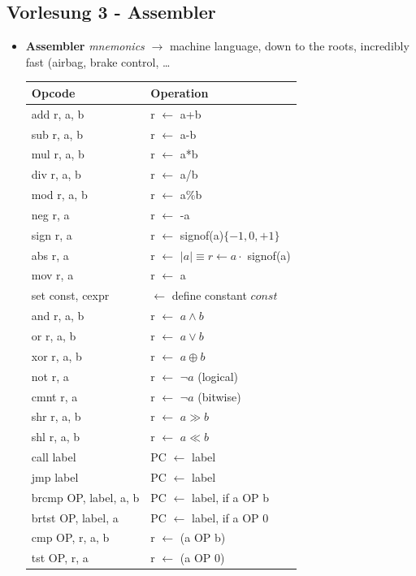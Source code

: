 \subsection*{Vorlesung 3 - Assembler}
 \begin{itemize}
 \item \textbf{Assembler} \emph{mnemonics} $\to$ machine language, down to the roots, incredibly fast (airbag, brake control, \dots \\
  \begin{tabular}{|ll|}
  \hline Opcode & Operation \\
  \hline add r, a, b & r $\leftarrow$ a+b \\
  sub r, a, b & r $\leftarrow$ a-b \\
  mul r, a, b & r $\leftarrow$ a*b \\
  div r, a, b & r $\leftarrow$ a/b \\
  mod r, a, b & r $\leftarrow$ a\%b \\
  neg r, a    & r $\leftarrow$ -a \\
  sign r, a   & r $\leftarrow$ signof(a)$\lbrace -1,0,+1 \rbrace$ \\
  abs r, a    & r $\leftarrow$ $\vert a\vert \equiv r \leftarrow a\cdot$ signof(a)\\
  mov r, a    & r $\leftarrow$ a \\
  set const, cexpr & $\leftarrow$ define constant $const$ \\
  and r, a, b & r $\leftarrow$ $a\land b$ \\
  or r, a, b  & r $\leftarrow$ $a \lor b$ \\
  xor r, a, b & r $\leftarrow$ $a \oplus b$ \\
  not r, a    & r $\leftarrow$ $\neg a$ (logical) \\
  cmnt r, a   & r $\leftarrow$ $\neg a$ (bitwise) \\
  shr r, a, b & r $\leftarrow$ $a\gg b$ \\
  shl r, a, b & r $\leftarrow$ $a\ll b$ \\
  call label  & PC $\leftarrow$ label \\
  jmp label   & PC $\leftarrow$ label \\
  brcmp OP, label, a, b & PC $\leftarrow$ label, if a OP b \\
  brtst OP, label, a & PC $\leftarrow$ label, if a OP 0 \\
  cmp OP, r, a, b & r $\leftarrow$ (a OP b) \\
  tst OP, r, a & r $\leftarrow$ (a OP 0) \\

\end{tabular}
\end{itemize}
